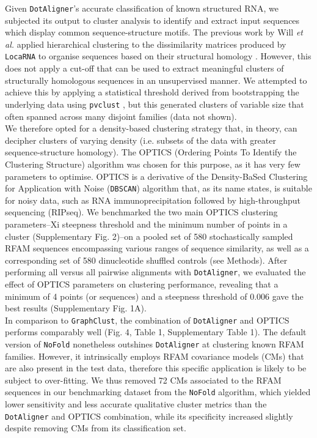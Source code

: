 \documentclass{bmcart}
\newcommand\dotaligner{\texttt{DotAligner}}
\newcommand\locarna{\texttt{LocaRNA}}
\begin{document}
Given \dotaligner{}'s accurate classification of known structured RNA, we subjected its
output to cluster analysis to identify and extract input sequences which display common
sequence-structure motifs. The previous work by Will \textit{et al.} applied hierarchical clustering 
to the dissimilarity matrices produced by \locarna{} to organise sequences based on their
structural homology \cite{Will17432929}. However, this does not apply a cut-off that can be used 
to extract meaningful clusters of structurally homologous sequences in an unsupervised 
manner. We attempted to achieve this by applying a statistical threshold derived from 
bootstrapping the underlying data using \texttt{pvclust} \cite{suzuki2006pvclust}, but this
generated clusters of variable size that often spanned across many disjoint families 
(data not shown).\\


We therefore opted for a density-based clustering strategy that, in theory, can decipher 
clusters of varying density (i.e. subsets of the data with greater sequence-structure homology). 
The OPTICS (Ordering Points To Identify the Clustering Structure) algorithm \cite{ankerst99ordering}
was chosen for this purpose, as it has very few parameters to optimise. 
OPTICS is a derivative of the Density-BaSed Clustering for Application with Noise
 (\texttt{DBSCAN}) \cite{ester1996density} algorithm that, as its name states, is suitable 
 for noisy data, such as RNA immunoprecipitation followed by high-throughput sequencing 
 (RIPseq). We  benchmarked the two main OPTICS clustering parameters--Xi steepness threshold 
and the minimum number of points in a cluster (Supplementary Fig. 2)--on 
a pooled set of 580 stochastically sampled RFAM sequences encompassing various ranges of sequence similarity, 
as well as a corresponding set of 580 dinucleotide shuffled controls (see Methods). 
After performing all versus all pairwise alignments with \dotaligner{}, 
we evaluated the effect of OPTICS parameters on clustering performance, 
revealing that a minimum of 4 points (or sequences) and a steepness threshold of 0.006 
gave the best results (Supplementary  Fig. 1A). \\

In comparison to \texttt{GraphClust},  the combination of \dotaligner{} and OPTICS performs comparably well (Fig. 4, Table 1, Supplementary Table 1). 
The default version of \texttt{NoFold} nonetheless outshines \dotaligner{} at clustering known RFAM families. 
However, it intrinsically employs RFAM covariance models (CMs) that are also present in the test data, 
therefore this specific application is likely to be subject to over-fitting. 
We thus removed 72 CMs associated to the RFAM sequences in our benchmarking 
dataset from the \texttt{NoFold} algorithm, which yielded lower sensitivity and 
less accurate qualitative cluster metrics than the \dotaligner{} and OPTICS combination, while 
its specificity increased slightly despite removing CMs from its classification set. 
\end{document}
